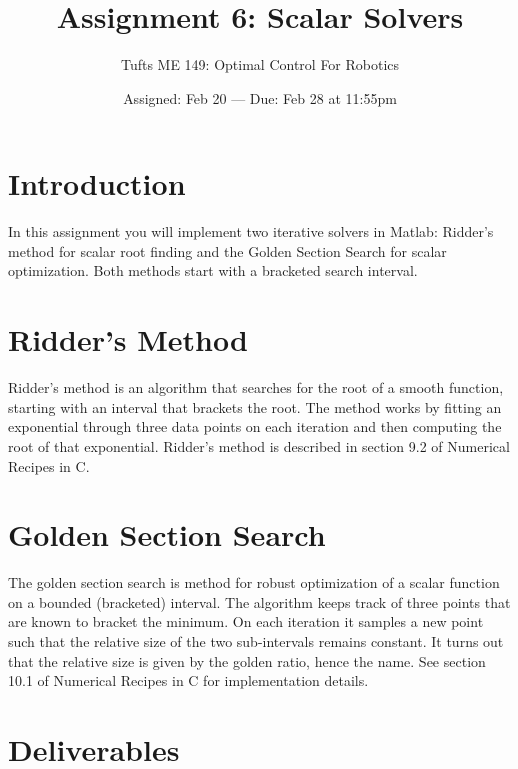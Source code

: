 

\title{Assignment 6:  Scalar Solvers}
\date{Assigned:  Feb 20  ---  Due:  Feb 28 at 11:55pm}
\author{Tufts ME 149:  Optimal Control For Robotics}

\maketitle

\section*{Introduction}

In this assignment you will implement two iterative solvers in Matlab:
Ridder's method for scalar root finding and the Golden Section Search for
scalar optimization. Both methods start with a bracketed search interval.

\section*{Ridder's Method}

Ridder's method is an algorithm that searches for the root of a smooth function,
starting with an interval that brackets the root.
The method works by fitting an exponential through three data points on each
iteration and then computing the root of that exponential.
Ridder's method is described in section 9.2 of Numerical Recipes in C.

\section*{Golden Section Search}

The golden section search is method for robust optimization of a
scalar function on a bounded (bracketed) interval.
The algorithm keeps track of three points that are known to bracket the minimum.
On each iteration it samples a new point such that the relative size of the
two sub-intervals remains constant. It turns out that the relative size is
given by the golden ratio, hence the name.
See section 10.1 of Numerical Recipes in C for implementation details.

\section*{Deliverables}

